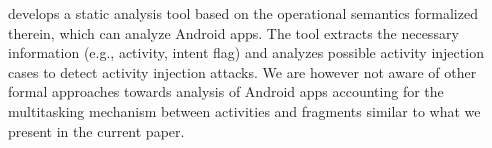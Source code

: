 \cite{LHR17}  develops a static analysis tool based on the operational semantics formalized therein, which can analyze  Android apps.  The tool extracts the necessary information (e.g., activity, intent flag)  and
analyzes possible activity injection cases
to detect activity injection attacks. We are however not aware of other formal approaches towards analysis of Android apps accounting for the multitasking mechanism between activities and fragments similar to what we present in the current paper. 


 